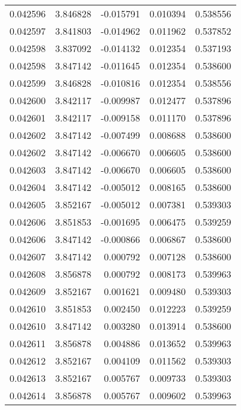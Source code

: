 \begin{tabular}{lrrrr}
0.042596    &  3.846828 & -0.015791 &  0.010394 &             0.538556 \\
0.042597    &  3.841803 & -0.014962 &  0.011962 &             0.537852 \\
0.042598    &  3.837092 & -0.014132 &  0.012354 &             0.537193 \\
0.042598    &  3.847142 & -0.011645 &  0.012354 &             0.538600 \\
0.042599    &  3.846828 & -0.010816 &  0.012354 &             0.538556 \\
0.042600    &  3.842117 & -0.009987 &  0.012477 &             0.537896 \\
0.042601    &  3.842117 & -0.009158 &  0.011170 &             0.537896 \\
0.042602    &  3.847142 & -0.007499 &  0.008688 &             0.538600 \\
0.042602    &  3.847142 & -0.006670 &  0.006605 &             0.538600 \\
0.042603    &  3.847142 & -0.006670 &  0.006605 &             0.538600 \\
0.042604    &  3.847142 & -0.005012 &  0.008165 &             0.538600 \\
0.042605    &  3.852167 & -0.005012 &  0.007381 &             0.539303 \\
0.042606    &  3.851853 & -0.001695 &  0.006475 &             0.539259 \\
0.042606    &  3.847142 & -0.000866 &  0.006867 &             0.538600 \\
0.042607    &  3.847142 &  0.000792 &  0.007128 &             0.538600 \\
0.042608    &  3.856878 &  0.000792 &  0.008173 &             0.539963 \\
0.042609    &  3.852167 &  0.001621 &  0.009480 &             0.539303 \\
0.042610    &  3.851853 &  0.002450 &  0.012223 &             0.539259 \\
0.042610    &  3.847142 &  0.003280 &  0.013914 &             0.538600 \\
0.042611    &  3.856878 &  0.004886 &  0.013652 &             0.539963 \\
0.042612    &  3.852167 &  0.004109 &  0.011562 &             0.539303 \\
0.042613    &  3.852167 &  0.005767 &  0.009733 &             0.539303 \\
0.042614    &  3.856878 &  0.005767 &  0.009602 &             0.539963 \\

\end{tabular}
